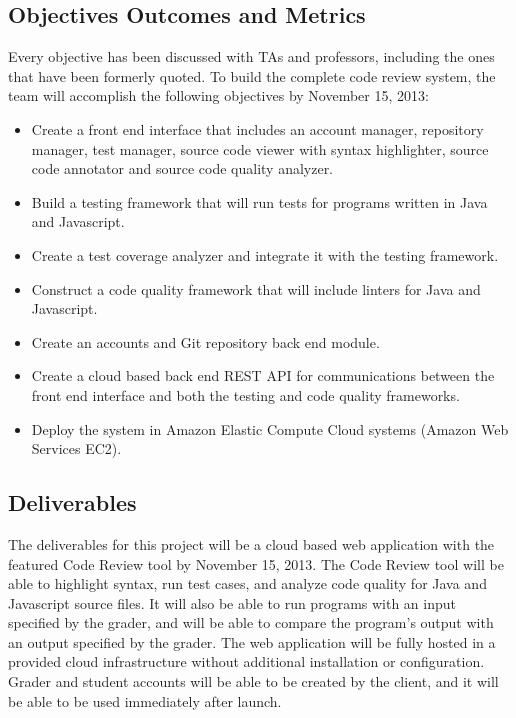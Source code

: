
\subsection{Objectives Outcomes and Metrics}

Every objective has been discussed with TAs and professors, including the ones
that have been formerly quoted. To build the complete code review system, the
team will accomplish the following objectives by November 15, 2013:

\begin{itemize}
\item Create a front end interface that includes an account manager, repository
manager, test manager, source code viewer with syntax highlighter, source code
annotator and source code quality analyzer.

\item Build a testing framework that will run tests for programs written in
Java and Javascript.

\item Create a test coverage analyzer and integrate it with the testing
framework.

\item Construct a code quality framework that will include linters for Java and
Javascript.

\item Create an accounts and Git repository back end module.

\item Create a cloud based back end REST API for communications between the
front end interface and both the testing and code quality frameworks.

\item Deploy the system in Amazon Elastic Compute Cloud systems (Amazon Web
Services EC2).

\end{itemize}
\subsection{Deliverables}

The deliverables for this project will be a cloud based web application with the
featured Code Review tool by November 15, 2013. The Code Review tool will be
able to highlight syntax, run test cases, and analyze code quality for Java and
Javascript source files. It will also be able to run programs with an input
specified by the grader, and will be able to compare the program's output with
an output specified by the grader. The web application will be fully hosted in a
provided cloud infrastructure without additional installation or configuration.
Grader and student accounts will be able to be created by the client, and it
will be able to be used immediately after launch.
